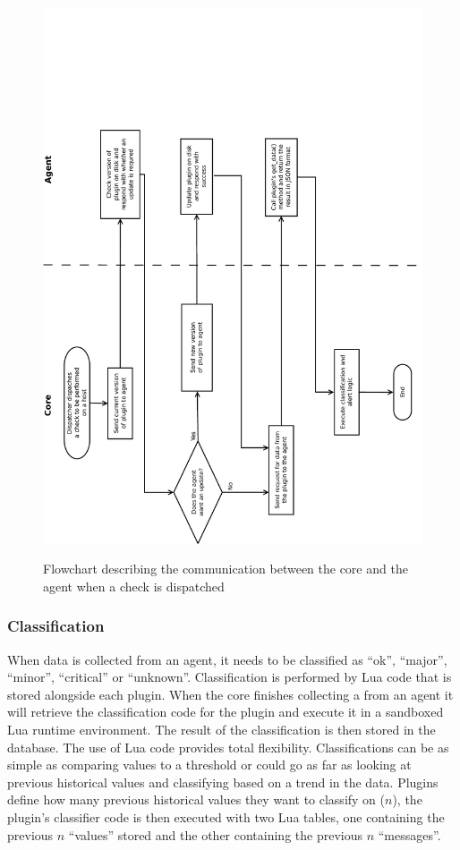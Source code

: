 \documentclass[bsc,deptreport,twoside,parskip,singlespacing,notimes]{infthesis}
\begin{document}
\begin{figure}[H]
	\caption{Flowchart describing the communication between the core and the agent
		when a check is dispatched}
	\includegraphics[scale=0.6, angle=-90]{assets/core_agent_communication.pdf}
	\label{core_agent_communication}
\end{figure}

\subsubsection{Classification}
\label{core-classification}

	When data is collected from an agent, it needs to be classified as ``ok'',
	``major'', ``minor'', ``critical'' or ``unknown''.  Classification is performed by Lua
	code that is stored alongside each plugin.  When the core finishes collecting a
	from an agent it will retrieve the classification code for the plugin and
	execute it in a sandboxed Lua runtime environment.  The result of the
	classification is then stored in the database.  The use of Lua code provides
	total flexibility. Classifications can be as simple as comparing values to a
	threshold or could go as far as looking at previous historical values and
	classifying based on a trend in the data. Plugins define how many previous
	historical values they want to classify on ($n$), the plugin's classifier code
	is then executed with two Lua tables, one containing the previous $n$ ``values''
	stored and the other containing the previous $n$ ``messages''.
\end{document}
